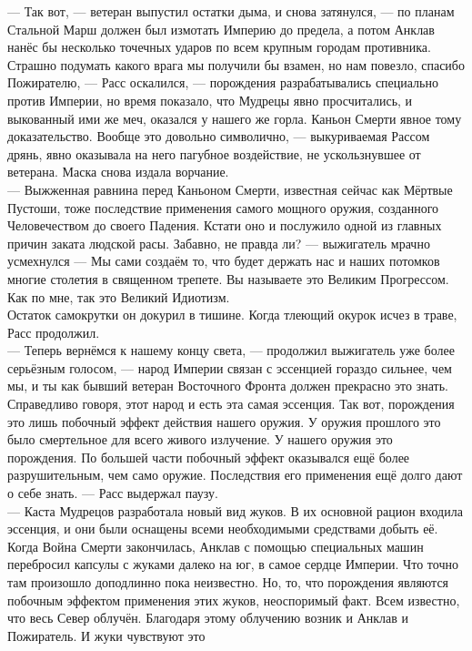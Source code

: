 \noindent --- Так вот, --- ветеран выпустил остатки дыма, и снова затянулся, 
--- по планам Стальной Марш должен был измотать Империю до предела, а потом 
Анклав нанёс бы несколько точечных ударов по всем крупным городам противника. 
Страшно подумать какого врага мы получили бы взамен, но нам повезло, спасибо 
Пожирателю, --- Расс оскалился, --- порождения разрабатывались специально 
против Империи, но время показало, что Мудрецы явно просчитались, и выкованный 
ими же меч, оказался у нашего же горла. Каньон Смерти явное тому доказательство. 
Вообще это довольно символично, --- выкуриваемая Рассом дрянь, явно оказывала 
на него пагубное воздействие, не ускользнувшее от ветерана. Маска снова издала 
ворчание.\\
--- Выжженная равнина перед Каньоном Смерти, известная сейчас как Мёртвые 
Пустоши, тоже последствие применения самого мощного оружия, созданного 
Человечеством до своего Падения. Кстати оно и послужило одной из главных причин 
заката людской расы. Забавно, не правда ли? --- выжигатель мрачно усмехнулся 
--- Мы сами создаём то, что будет держать нас и наших потомков многие столетия 
в священном трепете. Вы называете это Великим Прогрессом. Как по мне, так это 
Великий Идиотизм.\\
Остаток самокрутки он докурил в тишине. Когда тлеющий окурок исчез в траве, Расс 
продолжил.\\
--- Теперь вернёмся к нашему концу света, --- продолжил выжигатель уже более 
серьёзным голосом, --- народ Империи связан с эссенцией гораздо сильнее, чем 
мы, и ты как бывший ветеран Восточного Фронта должен прекрасно это знать. 
Справедливо говоря, этот народ и есть эта самая эссенция. Так вот, порождения 
это лишь побочный эффект действия нашего оружия. У оружия прошлого это было 
смертельное для всего живого излучение. У нашего оружия это порождения. По 
большей части побочный эффект оказывался ещё более разрушительным, чем само 
оружие. Последствия его применения ещё долго дают о себе знать. ---
Расс выдержал паузу.\\
--- Каста Мудрецов разработала новый вид жуков. В их основной рацион входила 
эссенция, и они были оснащены всеми необходимыми средствами добыть её. Когда 
Война Смерти закончилась, Анклав с помощью специальных машин перебросил капсулы 
с жуками далеко на юг, в самое сердце Империи. Что точно там произошло 
доподлинно пока неизвестно. Но, то, что порождения являются побочным эффектом 
применения этих жуков, неоспоримый факт. Всем известно, что весь Север облучён. 
Благодаря этому облучению возник и Анклав и Пожиратель. И жуки чувствуют это 
